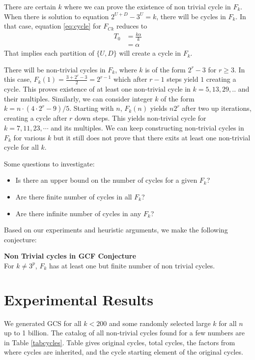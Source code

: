 \documentclass[12pt]{article} %
\begin{document}
There are certain $k$ where we can prove the existence of non trivial cycle in $F_k$. When there is solution to equation $2^{U+D} - 3^U = k$, there will be cycles in $F_k$. In that case, equation \eqref{eq:cycle} for $F_{C k}$ reduces to 
\begin{align*}
 T_0  & = \frac{k \alpha}{k}\\
      & = \alpha    
\end{align*}
That implies each partition of $\{U , D\}$ will create a cycle in $F_k$. 

There will be non-trivial cycles in $F_k$, where $k$ is of the form $2^r - 3$ for $r \geq 3$. In this case, $F_k(1) = \frac{3 + 2^r - 3}{2} = 2^{r-1}$ which after $r-1$ steps yield $1$ creating a cycle. This proves existence of at least one non-trivial cycle in $k = 5, 13, 29, ..$ and their multiples. Similarly, we can consider integer $k$ of the form $k = n \cdot (4 \cdot 2^r - 9) / 5$. Starting with $n$, $F_k(n)$ yields $n 2^r$ after two up iterations, creating a cycle after $r$ down steps. This yields non-trivial cycle for $k= 7, 11, 23, \cdots$ and its multiples. We can keep constructing non-trivial cycles in $F_k$ for various $k$ but it still does not prove that there exits at least one non-trivial cycle for all $k$.
\newline

\noindent
Some questions to investigate:
\begin{itemize}
    \item Is there an upper bound on the number of cycles for a given $F_k$?
    \item Are there finite number of cycles in all $F_k$?
    \item Are there infinite number of cycles in any $F_k$? 
\end{itemize}

Based on our experiments and heuristic arguments, we make the following conjecture:
\newline

\textbf{Non Trivial cycles in GCF Conjecture}\\
For $k \neq 3^p$, $F_k$ has at least one but finite number of non trivial cycles. 


\section{Experimental Results}

We generated GCS for all $k < 200$ and some randomly selected large $k$ for all $n$ up to 1 billion. The catalog of all non-trivial cycles found for a few numbers are in Table \ref{tabcycles}. Table gives original cycles, total cycles, the factors from where cycles are inherited, and the cycle starting element of the original cycles.
\end{document}
